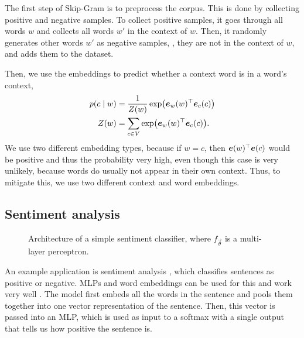 The first step of Skip-Gram is to preprocess the corpus. This is done by
collecting positive and negative samples. To collect positive samples,
it goes through all words $w$ and collects all words $w'$ in the context of
$w$. Then, it randomly generates other words $w'$ as negative samples, \ie,
they are not in the context of $w$, and adds them to the dataset.

Then, we use the embeddings to predict whether a context word is in a word's
context,
\begin{align*}
  p(c\mid w) &= \frac{1}{Z(w)} \exp \lft( \transpose{\vec{e}_w(w)} \vec{e}_c(c) \rgt) \\
  Z(w) &= \sum_{c \in V} \exp \lft( \transpose{\vec{e}_w(w)} \vec{e}_c(c) \rgt)
.\end{align*}
We use two different embedding types, because if $w=c$, then
$\bm{e}(w)^\top \bm{e}(c)$ would be positive and thus the probability
very high, even though this case is very unlikely, because words do usually not
appear in their own context. Thus, to mitigate this, we use two different
context and word embeddings.

\subsection{Sentiment analysis}

\begin{figure}[h!]
    \centering
    \caption{Architecture of a simple sentiment classifier, where
    $f_{\vec{\theta}}$ is a multi-layer perceptron.}
    \label{fig:sentiment-analysis}
\end{figure}

An example application is sentiment analysis \citep{pang2008opinion}, which
classifies sentences as positive or negative. MLPs and word embeddings can be
used for this and work very well \citep{iyyer2015deep}. The model first embeds
all the words in the sentence and pools them together into one vector
representation of the sentence. Then, this vector is
passed into an MLP, which is used as input to a softmax with a single output
that tells us how positive the sentence is.
